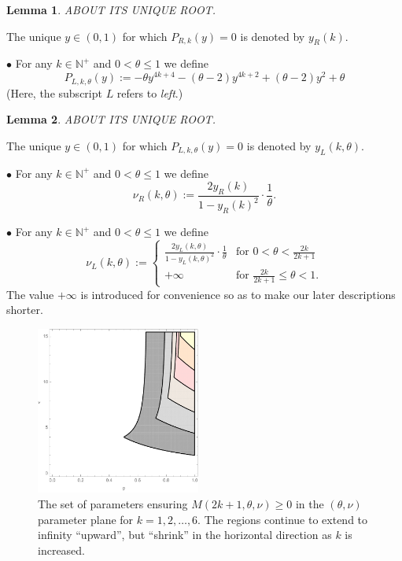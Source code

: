 \documentclass[a4paper]{article}
\newtheorem{lemma}{Lemma}
\newcommand{\te}{\theta}
\newcommand{\nul}{\nu_L(k,\theta)}
\newcommand{\nur}{\nu_R(k,\theta)}
\newcommand{\yl}{y_L(k,\theta)}
\newcommand{\yr}{y_R(k)}
\newcommand{\nplus}{\mathbb{N}^+}
\newcommand{\Por}{P_{R,k}(y)}
\newcommand{\Pol}{P_{L,k,\te}(y)}
\begin{document}
\begin{lemma}
ABOUT ITS UNIQUE ROOT.
\end{lemma}
The unique $y\in(0,1)$ for which $\Por=0$ is denoted by $\yr$. 

$\bullet$ For any $k\in\nplus$ and $0<\te\le 1$ we define
\[\Pol:=-\theta  y^{4 k+4}-(\theta -2) y^{4 k+2}+(\theta -2) y^2+\theta \]
(Here, the subscript $L$ refers to \textit{left}.) 
\begin{lemma}
ABOUT ITS UNIQUE ROOT.
\end{lemma}
The unique $y\in(0,1)$ for which $\Pol=0$ is denoted by $\yl$. 

$\bullet$ For any $k\in\nplus$ and $0<\te\le 1$ we define
\[\nur:=\frac{2\yr}{1-\yr^2}\cdot \frac{1}{\te}.\]

$\bullet$ For any $k\in\nplus$ and $0<\te\le 1$ we define
\[\nul:=\begin{cases}
 \frac{2\yl}{1-\yl^2}\cdot \frac{1}{\te} & \text{for } 0<\te<\frac{2k}{2k+1}\\
 +\infty & \text{for } \frac{2k}{2k+1}\le \te<1.
\end{cases}\]
The value $+\infty$ is introduced for convenience so as to make our later descriptions shorter.



\begin{figure}
\begin{center}
\includegraphics[width=0.48\textwidth]{fig_variousk.pdf}
\caption{The set of parameters ensuring $M(2k+1,\te,\nu)\ge 0$ in the $(\te,\nu)$ parameter plane for $k=1, 2, \ldots, 6$. The regions continue to extend to infinity ``upward'', but ``shrink'' in the horizontal direction as $k$ is increased.}\label{fig_variousk}
\end{center}
\end{figure}
\end{document}
